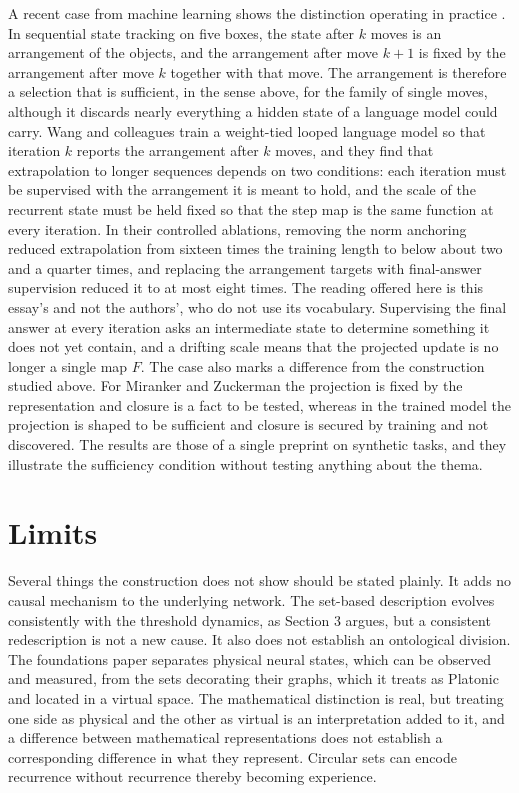 \documentclass[11pt, a4paper]{article}
\theoremstyle{plain}
\theoremstyle{definition}
\theoremstyle{remark}
\begin{document}
A recent case from machine learning shows the distinction operating in practice \cite{wang2026par}. In sequential state tracking on five boxes, the state after $k$ moves is an arrangement of the objects, and the arrangement after move $k+1$ is fixed by the arrangement after move $k$ together with that move. The arrangement is therefore a selection that is sufficient, in the sense above, for the family of single moves, although it discards nearly everything a hidden state of a language model could carry. Wang and colleagues train a weight-tied looped language model so that iteration $k$ reports the arrangement after $k$ moves, and they find that extrapolation to longer sequences depends on two conditions: each iteration must be supervised with the arrangement it is meant to hold, and the scale of the recurrent state must be held fixed so that the step map is the same function at every iteration. In their controlled ablations, removing the norm anchoring reduced extrapolation from sixteen times the training length to below about two and a quarter times, and replacing the arrangement targets with final-answer supervision reduced it to at most eight times. The reading offered here is this essay's and not the authors', who do not use its vocabulary. Supervising the final answer at every iteration asks an intermediate state to determine something it does not yet contain, and a drifting scale means that the projected update is no longer a single map $F$. The case also marks a difference from the construction studied above. For Miranker and Zuckerman the projection is fixed by the representation and closure is a fact to be tested, whereas in the trained model the projection is shaped to be sufficient and closure is secured by training and not discovered. The results are those of a single preprint on synthetic tasks, and they illustrate the sufficiency condition without testing anything about the thema.

\section{Limits}

Several things the construction does not show should be stated plainly. It adds no causal mechanism to the underlying network. The set-based description evolves consistently with the threshold dynamics, as Section 3 argues, but a consistent redescription is not a new cause. It also does not establish an ontological division. The foundations paper separates physical neural states, which can be observed and measured, from the sets decorating their graphs, which it treats as Platonic and located in a virtual space. The mathematical distinction is real, but treating one side as physical and the other as virtual is an interpretation added to it, and a difference between mathematical representations does not establish a corresponding difference in what they represent. Circular sets can encode recurrence without recurrence thereby becoming experience.
\end{document}
